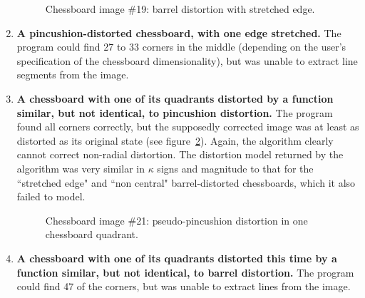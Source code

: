 \begin{enumerate}
\begin{figure}[H]
  \caption{Chessboard image \#19: barrel distortion with stretched edge.}
  \label{fig:chess-19}
\end{figure}
  \item \textbf{A pincushion-distorted chessboard, with one edge stretched.} The program could find 27 to 33 corners in the middle (depending on the user's specification of the chessboard dimensionality), but was unable to extract line segments from the image.
  \item \textbf{A chessboard with one of its quadrants distorted by a function similar, but not identical, to pincushion distortion.} The program found all corners correctly, but the supposedly corrected image was at least as distorted as its original state (see figure~\ref{fig:chess-21}). Again, the algorithm clearly cannot correct non-radial distortion. The distortion model returned by the algorithm was very similar in $\kappa$ signs and magnitude to that for the ``stretched edge" and ``non central" barrel-distorted chessboards, which it also failed to model.
\begin{figure}[H]
  \centering
  \caption{Chessboard image \#21: pseudo-pincushion distortion in one chessboard quadrant.}
  \label{fig:chess-21}
\end{figure}
  \item \textbf{A chessboard with one of its quadrants distorted this time by a function similar, but not identical, to barrel distortion.} The program could find 47 of the corners, but was unable to extract lines from the image.
\end{enumerate}

